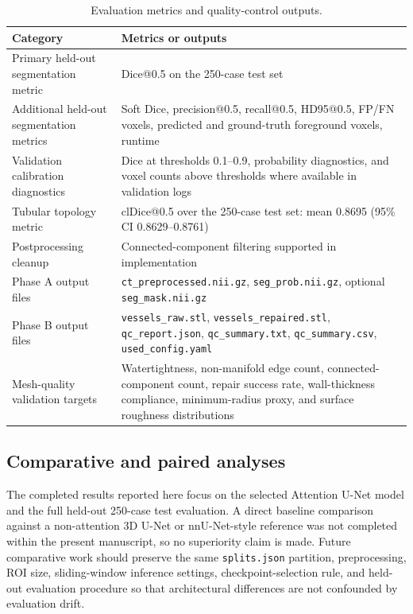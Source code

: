 \documentclass[anonymous]{iopjournal}
\begin{document}
\begin{table}[!t]
\centering
\caption{Evaluation metrics and quality-control outputs.}
\label{tab:evaluation}
\begin{threeparttable}
\footnotesize
\begin{tabularx}{0.92\textwidth}{L{0.35\textwidth}Y}
\toprule
\textbf{Category} & \textbf{Metrics or outputs} \\
\midrule
Primary held-out segmentation metric & Dice@0.5 on the 250-case test set \\
Additional held-out segmentation metrics & Soft Dice, precision@0.5, recall@0.5, HD95@0.5, FP/FN voxels, predicted and ground-truth foreground voxels, runtime \\
Validation calibration diagnostics & Dice at thresholds 0.1--0.9, probability diagnostics, and voxel counts above thresholds where available in validation logs \\
Tubular topology metric & clDice@0.5 over the 250-case test set: mean 0.8695 (95\% CI 0.8629--0.8761) \\
Postprocessing cleanup & Connected-component filtering supported in implementation \\
Phase A output files & \texttt{ct\_preprocessed.nii.gz}, \texttt{seg\_prob.nii.gz}, optional \texttt{seg\_mask.nii.gz} \\
Phase B output files & \texttt{vessels\_raw.stl}, \texttt{vessels\_repaired.stl}, \texttt{qc\_report.json}, \texttt{qc\_summary.txt}, \texttt{qc\_summary.csv}, \texttt{used\_config.yaml} \\
Mesh-quality validation targets & Watertightness, non-manifold edge count, connected-component count, repair success rate, wall-thickness compliance, minimum-radius proxy, and surface roughness distributions \\
\bottomrule
\end{tabularx}
\end{threeparttable}
\end{table}

\subsection{Comparative and paired analyses}
\label{subsec:paired}

The completed results reported here focus on the selected Attention U-Net model and the full held-out 250-case test evaluation. A direct baseline comparison against a non-attention 3D U-Net or nnU-Net-style reference was not completed within the present manuscript, so no superiority claim is made. Future comparative work should preserve the same \texttt{splits.json} partition, preprocessing, ROI size, sliding-window inference settings, checkpoint-selection rule, and held-out evaluation procedure so that architectural differences are not confounded by evaluation drift.
\end{document}
